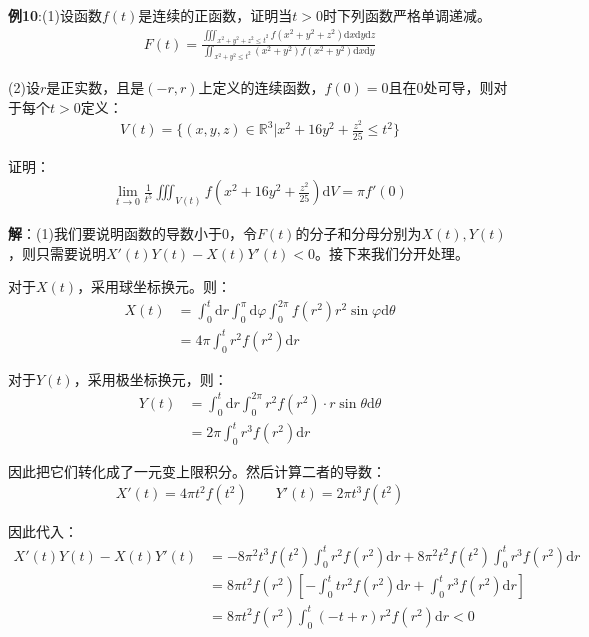 \documentclass{ctexart}
\let\oldtextbf\textbf
\renewcommand{\textbf}[1]{\textcolor{brown!50!red}{\oldtextbf{#1}}}
\begin{document}
\textbf{例10}:(1)设函数$f(t)$是连续的正函数，证明当$t>0$时下列函数严格单调递减。
\begin{align*}
    F(t)=\frac{\iiint_{x^2+y^2+z^2\leq t^2}f(x^2+y^2+z^2)\mathrm{d}x\mathrm{d}y\mathrm{d}z}{\iint_{x^2+y^2\leq t^2}(x^2+y^2)f(x^2+y^2)\mathrm{d}x\mathrm{d}y}
\end{align*}

(2)设$r$是正实数，且是$(-r,r)$上定义的连续函数，$f(0)=0$且在0处可导，则对于每个$t>0$定义：
\begin{align*}
    V(t)=\{(x,y,z)\in\mathbb{R}^3|x^2+16y^2+\frac{z^2}{25}\leq t^2\}
\end{align*}

证明：
\begin{align*}
    \lim_{t\to 0}\frac{1}{t^5}\iiint_{V(t)}f(x^2+16y^2+\frac{z^2}{25})\mathrm{d}V=\pi f'(0)
\end{align*}

\textbf{解}：(1)我们要说明函数的导数小于0，令$F(t)$的分子和分母分别为$X(t),Y(t)$，则只需要说明$X'(t)Y(t)-X(t)Y'(t)<0$。接下来我们分开处理。

对于$X(t)$，采用球坐标换元。则：
\begin{align*}
X(t)&=\int_0^t\mathrm{d}r\int_0^\pi\mathrm{d}\varphi\int_0^{2\pi}f(r^2)r^2\sin\varphi\mathrm{d}\theta\\
&=4\pi\int_0^t r^2f(r^2)\mathrm{d}r
\end{align*}

对于$Y(t)$，采用极坐标换元，则：
\begin{align*}
    Y(t)&=\int_0^t\mathrm{d}r \int_0^{2\pi} r^2f(r^2)\cdot r\sin\theta\mathrm{d}\theta\\
    &=2\pi\int_0^tr^3f(r^2)\mathrm{d}r
\end{align*}

因此把它们转化成了一元变上限积分。然后计算二者的导数：
\begin{align*}
    X'(t)=4\pi t^2f(t^2)\qquad Y'(t)=2\pi t^3f(t^2)
\end{align*}

因此代入：
\begin{align*}
    X'(t)Y(t)-X(t)Y'(t)&=-8\pi ^2t^3f(t^2)\int_0^t r^2f(r^2)\mathrm{d}r+8\pi^2 t^2f(t^2)\int_0^t  r^3f(r^2)\mathrm{d}r\\
    &=8\pi t^2f(r^2)\left[ - \int_0^t tr^2f(r^2)\mathrm{d}r+ \int _0^t r^3f(r^2)\mathrm{d}r \right]\\
    &=8\pi t^2f(r^2) \int_0^t (-t+r)r^2f(r^2)\mathrm{d}r<0
\end{align*}
\end{document}
